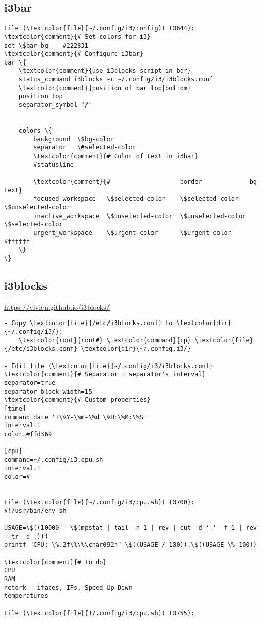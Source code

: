 \documentclass[10pt, a4paper, onecolumn, openany]{book}         %
\begin{document}
\subsection{i3bar}
\begin{Verbatim}[commandchars=\\\{\}]
File (\textcolor{file}{~/.config/i3/config}) (0644):
\textcolor{comment}{# Set colors for i3}
set \$bar-bg    #222831
\textcolor{comment}{# Configure i3bar}
bar \{
    \textcolor{comment}{use i3blocks script in bar}
    status_command i3blocks -c ~/.config/i3/i3blocks.conf
    \textcolor{comment}{position of bar top|bottom}
    position top
    separator_symbol "/"
    
    
    colors \{
        background  \$bg-color
        separator   \#selected-color
        \textcolor{comment}{# Color of text in i3bar}
        #statusline  
        
        \textcolor{comment}{#                   border             bg                 text}
        focused_workspace   \$selected-color    \$selected-color    \$unselected-color
        inactive_workspace  \$unselected-color  \$unselected-color  \$selected-color
        urgent_workspace    \$urgent-color      \$urgent-color      #ffffff
    \}
\}
\end{Verbatim}

\subsection{i3blocks}
\underline{\url{https://vivien.github.io/i3blocks/}}
\begin{Verbatim}[commandchars=\\\{\}]
- Copy \textcolor{file}{/etc/i3blocks.conf} to \textcolor{dir}{~/.config/i3/}:
    \textcolor{root}{root#} \textcolor{command}{cp} \textcolor{file}{/etc/i3blocks.conf} \textcolor{dir}{~/.config.i3/}

- Edit file (\textcolor{file}{~/.config/i3/i3blocks.conf}
\textcolor{comment}{# Separator + separator's interval}
separator=true
separator_block_width=15
\textcolor{comment}{# Custom properties}
[time]
command=date '+\%Y-\%m-\%d \%H:\%M:\%S'
interval=1
color=#ffd369

[cpu]
command=~/.config/i3.cpu.sh
interval=1
color=#


File (\textcolor{file}{~/.config/i3/cpu.sh}) (0700):
#!/usr/bin/env sh

USAGE=\$((10000 - \$(mpstat | tail -n 1 | rev | cut -d '.' -f 1 | rev | tr -d .)))
printf "CPU: \%.2f\%\%\char092n" \$((USAGE / 100)).\$((USAGE \% 100))

\textcolor{comment}{# To do}
CPU
RAM
netork - ifaces, IPs, Speed Up Down
temperatures

File (\textcolor{file}{!/.config/i3/cpu.sh}) (0755):

\end{Verbatim}
\end{document}

